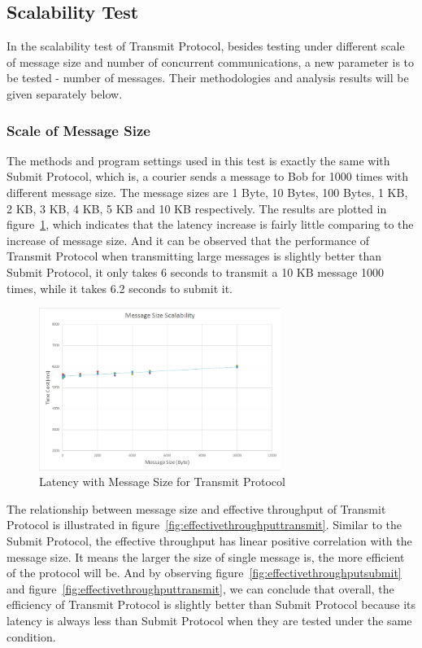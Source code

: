 \subsection{Scalability Test}
In the scalability test of Transmit Protocol, besides testing under different scale of message size and number of concurrent communications, a new parameter is to be tested - number of messages. Their methodologies and analysis results will be given separately below.

\subsubsection{Scale of Message Size}
The methods and program settings used in this test is exactly the same with Submit Protocol, which is, a courier sends a message to Bob for 1000 times with different message size. The message sizes are 1 Byte, 10 Bytes, 100 Bytes, 1 KB, 2 KB, 3 KB, 4 KB, 5 KB and 10 KB respectively. The results are plotted in figure~\ref{fig:messagesizetransmit}, which indicates that the latency increase is fairly little comparing to the increase of message size. And it can be observed that the performance of Transmit Protocol when transmitting large messages is slightly better than Submit Protocol, it only takes 6 seconds to transmit a 10 KB message 1000 times, while it takes 6.2 seconds to submit it. 

\begin{figure}[h!]
\centering
\includegraphics[width=0.7\textwidth,natwidth=814,natheight=547]{figures/messagesizetransmit.png}
\caption{Latency with Message Size for Transmit Protocol}
\label{fig:messagesizetransmit}
\end{figure}

The relationship between message size and effective throughput of Transmit Protocol is illustrated in figure~\ref{fig:effectivethroughputtransmit}. Similar to the Submit Protocol, the effective throughput has linear positive correlation with the message size. It means the larger the size of single message is, the more efficient of the protocol will be. And by observing figure~\ref{fig:effectivethroughputsubmit} and figure~\ref{fig:effectivethroughputtransmit}, we can conclude that overall, the efficiency of Transmit Protocol is slightly better than Submit Protocol because its latency is always less than Submit Protocol when they are tested under the same condition.

